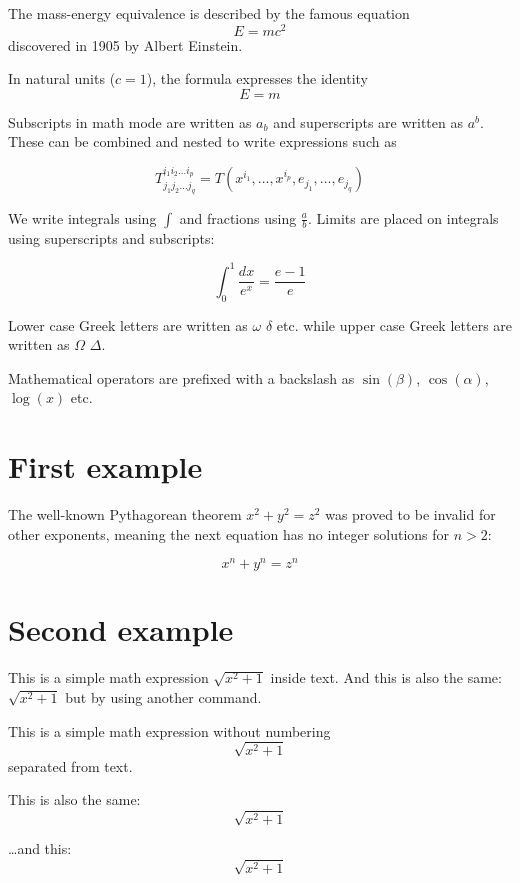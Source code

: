 \documentclass[12pt, letterpaper]{article}
\begin{document}
The mass-energy equivalence is described by the famous equation
\[ E=mc^2 \] discovered in 1905 by Albert Einstein.

In natural units ($c = 1$), the formula expresses the identity
\begin{equation}
  E=m
\end{equation}

Subscripts in math mode are written as $a_b$ and superscripts are
written as $a^b$. These can be combined and nested to write expressions such as

\[ T^{i_1 i_2 \dots i_p}_{j_1 j_2 \dots j_q} =
T(x^{i_1},\dots,x^{i_p},e_{j_1},\dots,e_{j_q}) \]

We write integrals using $\int$ and fractions using $\frac{a}{b}$.
Limits are placed on integrals using superscripts and subscripts:

\[ \int_0^1 \frac{dx}{e^x} =  \frac{e-1}{e} \]

Lower case Greek letters are written as $\omega$ $\delta$ etc. while
upper case Greek letters are written as $\Omega$ $\Delta$.

Mathematical operators are prefixed with a backslash as
$\sin(\beta)$, $\cos(\alpha)$, $\log(x)$ etc.

\section{First example}

The well-known Pythagorean theorem \(x^2 + y^2 = z^2\) was proved to
be invalid for other exponents, meaning the next equation has no
integer solutions for \(n>2\):

\[ x^n + y^n = z^n \]

\section{Second example}

This is a simple math expression \(\sqrt{x^2+1}\) inside text.
And this is also the same:
\begin{math}
  \sqrt{x^2+1}
\end{math}
but by using another command.

This is a simple math expression without numbering
\[\sqrt{x^2+1}\]
separated from text.

This is also the same:
\begin{displaymath}
  \sqrt{x^2+1}
\end{displaymath}

\ldots and this:
\begin{equation*}
  \sqrt{x^2+1}
\end{equation*}
\end{document}
